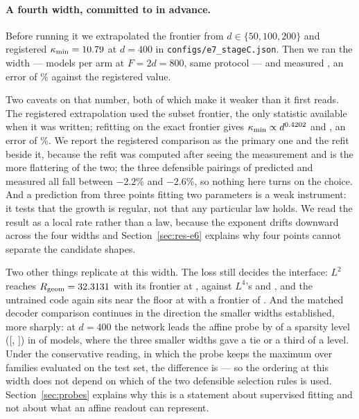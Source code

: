 \paragraph{A fourth width, committed to in advance.} Before running it we extrapolated the frontier
from $d\in\{50,100,200\}$ and registered $\kappa_{\min}=10.79$ at $d=400$ in
\texttt{configs/e7\_stageC.json}. Then we ran the width --- \ScSeeds{} models per arm at $F=2d=800$,
same protocol --- and measured \ScMeasured{}, an error of \ScRegisteredErrorPct\% against the
registered value.

Two caveats on that number, both of which make it weaker than it first reads. The registered
extrapolation used the subset frontier, the only statistic available when it was written; refitting
on the exact frontier gives $\kappa_{\min}\propto d^{0.4202}$ and \ScPredicted{}, an error of
\ScPredErrorPct\%. We report the registered comparison as the primary one and the refit beside it,
because the refit was computed after seeing the measurement and is the more flattering of the two;
the three defensible pairings of predicted and measured all fall between $-2.2\%$ and $-2.6\%$, so
nothing here turns on the choice. And a prediction from three points fitting two parameters is a
weak instrument: it tests that the growth is regular, not that any particular law holds. We read the
result as a local rate rather than a law, because the exponent drifts downward across the four widths
and Section~\ref{sec:res-e6} explains why four points cannot separate the candidate shapes.

Two other things replicate at this width. The loss still decides the interface: $L^2$ reaches
$R_{\mathrm{geom}}=32.3131$ with its frontier at \ScLtwoKappa, against $L^4$'s
\ScLfourRgeom{} and \ScLfourKappa{}, and the untrained code again sits near the floor at
\ScRandRgeom{} with a frontier of \ScRandKappa{}. And the matched decoder comparison continues in the
direction the smaller widths established, more sharply: at $d=400$ the network leads the affine probe
by \ScPrimDiff{} of a sparsity level ([\ScPrimCiLow, \ScPrimCiHigh]) in \ScPrimNetWins{} of
\ScSeeds{} models, where the three smaller widths gave a tie or a third of a level. Under the
conservative reading, in which the probe keeps the maximum over families evaluated on the test set,
the difference is \ScPrimTestMaxDiff{} --- so the ordering at this width does not depend on which of
the two defensible selection rules is used. Section~\ref{sec:probes} explains why this is a statement
about supervised fitting and not about what an affine readout can represent.

